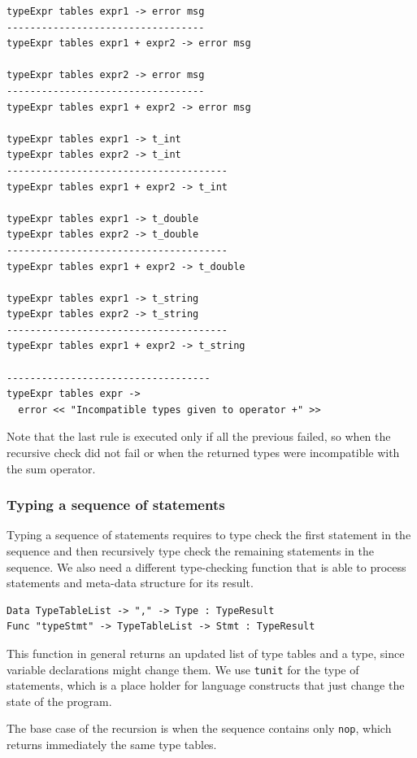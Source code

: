 \begin{lstlisting}
typeExpr tables expr1 -> error msg
----------------------------------
typeExpr tables expr1 + expr2 -> error msg

typeExpr tables expr2 -> error msg
----------------------------------
typeExpr tables expr1 + expr2 -> error msg

typeExpr tables expr1 -> t_int
typeExpr tables expr2 -> t_int
--------------------------------------
typeExpr tables expr1 + expr2 -> t_int

typeExpr tables expr1 -> t_double
typeExpr tables expr2 -> t_double
--------------------------------------
typeExpr tables expr1 + expr2 -> t_double

typeExpr tables expr1 -> t_string
typeExpr tables expr2 -> t_string
--------------------------------------
typeExpr tables expr1 + expr2 -> t_string

-----------------------------------
typeExpr tables expr -> 
  error << "Incompatible types given to operator +" >>
\end{lstlisting}

\noindent
Note that the last rule is executed only if all the previous failed, so when the recursive check did not fail or when the returned types were incompatible with the sum operator.

\subsubsection{Typing a sequence of statements}
Typing a sequence of statements requires to type check the first statement in the sequence and then recursively type check the remaining statements in the sequence. We also need a different type-checking function that is able to process statements and meta-data structure for its result.

\begin{lstlisting}
Data TypeTableList -> "," -> Type : TypeResult
Func "typeStmt" -> TypeTableList -> Stmt : TypeResult
\end{lstlisting}

\noindent
This function in general returns an updated list of type tables and a type, since variable declarations might change them. We use \texttt{t\textunderscore unit} for the type of statements, which is a place holder for language constructs that just change the state of the program.

The base case of the recursion is when the sequence contains only \texttt{nop}, which returns immediately the same type tables.

